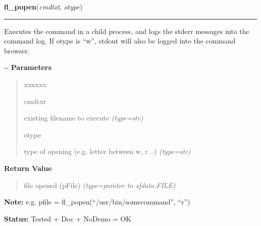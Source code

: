 \hspace{.8\funcindent}\begin{boxedminipage}{\funcwidth}

    \raggedright \textbf{fl\_popen}(\textit{cmdtxt}, \textit{otype})

    \vspace{-1.5ex}

    \rule{\textwidth}{0.5\fboxrule}
\setlength{\parskip}{2ex}

Executes the command in a child process, and logs the stderr messages
into the command log. If otype is ``w'', stdout will also be logged into
the command browser.

-{}-
\setlength{\parskip}{1ex}
      \textbf{Parameters}
      \vspace{-1ex}

      \begin{quote}
        \begin{Ventry}{xxxxxx}

          \item[cmdtxt]


existing filename to execute
            {\it (type=str)}

          \item[otype]


type of opening (e.g. letter between w, r ..)
            {\it (type=str)}

        \end{Ventry}

      \end{quote}

      \textbf{Return Value}
    \vspace{-1ex}

      \begin{quote}

file opened (pFile)
      {\it (type=pointer to xfdata.FILE)}

      \end{quote}

\textbf{Note:} 
e.g. pfile = fl\_popen(``/usr/bin/somecommand'', ``r'')


\textbf{Status:} 
Tested + Doc + NoDemo = OK


    \end{boxedminipage}

    \label{xformslib:flgoodies:fl_pclose}


